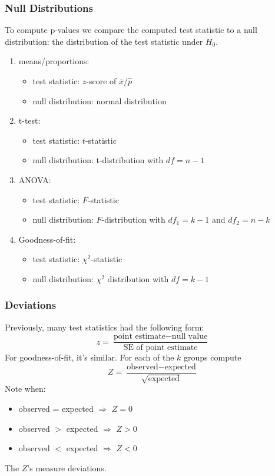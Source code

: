 \documentclass[slides]{beamer}
\newcommand{\blue}[1]{\textcolor{blue2}{#1}}
\newcommand{\xbar}{\overline{x}}
\begin{document}
\begin{frame}[fragile]
\frametitle{Null Distributions}
To compute p-values we compare the \blue{computed test statistic} to a \blue{null distribution}:  the distribution of the test statistic under $H_0$.

\begin{enumerate}
\pause\item \blue{means/proportions}:
\begin{itemize}
\item test statistic: $z$-score of $\xbar / \widehat{p}$
\item null distribution: normal distribution
\end{itemize}
\pause\item \blue{t-test}:  
\begin{itemize}
\item test statistic: $t$-statistic
\item null distribution: t-distribution with $df=n-1$
\end{itemize}
\pause\item \blue{ANOVA}:  
\begin{itemize}
\item test statistic: $F$-statistic 
\item null distribution: $F$-distribution with $df_1=k-1$ and $df_2 = n-k$
\end{itemize}
\pause\item \blue{Goodness-of-fit}:
\begin{itemize}
\item test statistic: $\chi^2$-statistic
\item null distribution: $\chi^2$ distribution with $df=k-1$
\end{itemize}
\end{enumerate}

\end{frame}


\begin{frame}[fragile]
\frametitle{Deviations}
%
%
Previously, many test statistics had the following form:  
\[
z = \frac{\mbox{point estimate} - \mbox{null value}}{\mbox{SE of point estimate}}
\]
\pause For goodness-of-fit, it's similar.  For each of the $k$ groups compute
\[
Z = \frac{\mbox{observed} - \mbox{expected}}{\sqrt{\mbox{expected}}}
\]
\pause Note when:
\begin{itemize}
\item observed = expected $\Rightarrow$ $Z=0$
\item observed $>$ expected $\Rightarrow$ $Z>0$
\item observed $<$ expected $\Rightarrow$ $Z<0$
\end{itemize}

The $Z$'s measure deviations.
\end{frame}
\end{document}
